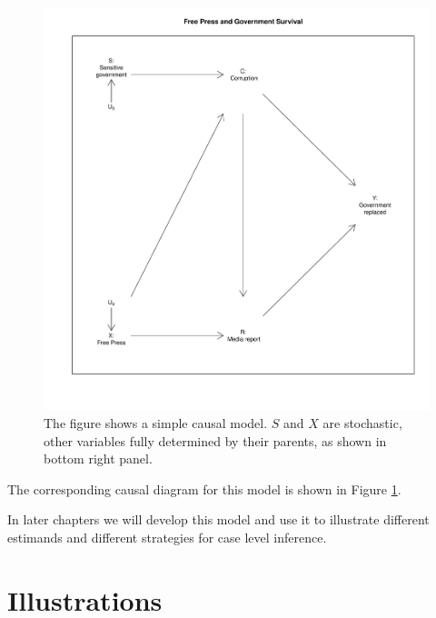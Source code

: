 \documentclass[
  12pt,
]{book}
\begin{document}
\begin{figure}

{\centering \includegraphics[width=\textwidth]{ii_files/figure-latex/running-1} 

}

\caption{The figure shows a simple causal model. $S$ and $X$ are stochastic, other variables fully determined by their parents, as shown in bottom right panel.}\label{fig:running}
\end{figure}

The corresponding causal diagram for this model is shown in Figure \ref{fig:running}.

In later chapters we will develop this model and use it to illustrate different estimands and different strategies for case level inference.

\hypertarget{illustrations}{%
\section{Illustrations}\label{illustrations}}
\end{document}
